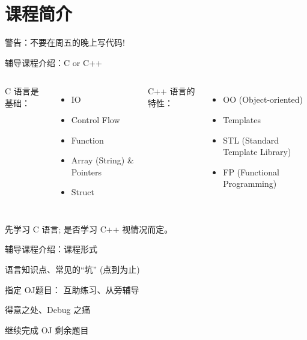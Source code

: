 \section{课程简介}

\begin{frame}{警告：不要在周五的晚上写代码!}
\end{frame}


\begin{frame}{辅导课程介绍：C or C++}
  \begin{columns}
      C 语言是基础：
      \begin{itemize}
	\item IO
	\item Control Flow
	\item Function
	\item Array (String) \& Pointers
	\item Struct
      \end{itemize}
      C++ 语言的特性：
      \begin{itemize}
	\item OO (Object-oriented)
	\item Templates
	\item STL (Standard Template Library)
	\item FP (Functional Programming)
      \end{itemize}
  \end{columns}

  \vspace{1.00cm}
  \centerline{先学习 C 语言; 是否学习 C++ 视情况而定。}
\end{frame}

\begin{frame}{辅导课程介绍：课程形式}
  \begin{description}
    \setlength{\itemsep}{8pt}
    \item[讲解] 语言知识点、常见的``坑'' (点到为止)
    \item[练习] 指定 OJ题目： 互助练习、从旁辅导
    \item[分享] 得意之处、Debug 之痛
    \pause
    \item[课后] 继续完成 OJ 剩余题目
  \end{description}
\end{frame}

